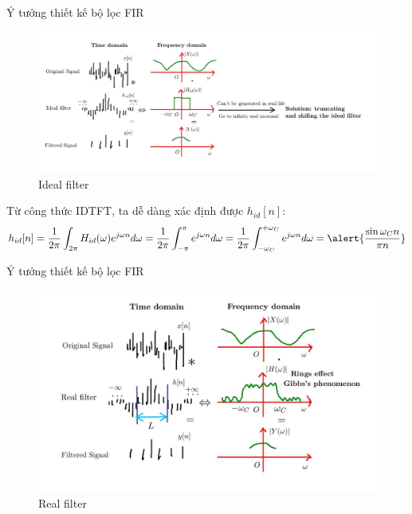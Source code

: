 \documentclass[8pt]{beamer}
\begin{document}
\begin{frame}{Ý tưởng thiết kế bộ lọc FIR}
	\begin{figure}[h]
		\includegraphics[width=1.1\textwidth]{2.jpg}
		\caption{Ideal filter}			\label{fig:re2}
	\end{figure}
	Từ công thức IDTFT, ta dễ dàng xác định được $h_{id}[n]$:
	$$h_{id}[n]=\frac{1}{2\pi}\int_{2\pi}H_{id}(\omega)e^{j\omega n}d\omega=\frac{1}{2\pi}\int_{-\pi}^{\pi}e^{j\omega n}d\omega=\frac{1}{2\pi}\int_{-\omega_{C}}^{+\omega_{C}}e^{j\omega n}d\omega=\alert{\frac{\sin{\omega_{C}n}}{\pi n}}$$

\end{frame}
\begin{frame}{Ý tưởng thiết kế bộ lọc FIR}
	\begin{figure}[h]
		\includegraphics[width=1.1\textwidth]{3.jpg}
		\caption{Real filter}			\label{fig:re3}
	\end{figure}
\end{frame}
\end{document}
